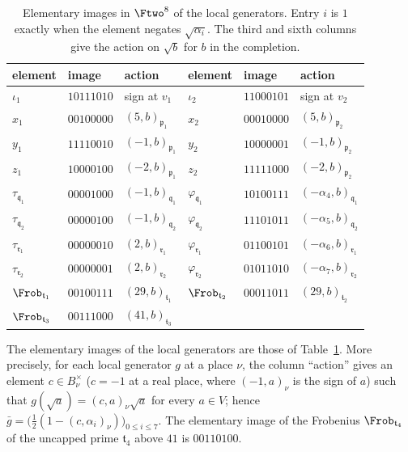 \begin{table}[htbp]
\centering
\caption{Elementary images in $\Ftwo^8$ of the local generators. Entry $i$
is $1$ exactly when the element negates $\sqrt{\alpha_i}$. The third and
sixth columns give the action on $\sqrt b$ for $b$ in the completion.}
\label{tw:vector-table}
\begin{tabular}{lll@{\qquad}lll}
\toprule
element & image & action & element & image & action\\
\midrule
$\iota_1$ & $10111010$ & sign at $v_1$ & $\iota_2$ & $11000101$ & sign at $v_2$\\
$x_1$ & $00100000$ & $(5,b)_{\mathfrak p_1}$ & $x_2$ & $00010000$ & $(5,b)_{\mathfrak p_2}$\\
$y_1$ & $11110010$ & $(-1,b)_{\mathfrak p_1}$ & $y_2$ & $10000001$ & $(-1,b)_{\mathfrak p_2}$\\
$z_1$ & $10000100$ & $(-2,b)_{\mathfrak p_1}$ & $z_2$ & $11111000$ & $(-2,b)_{\mathfrak p_2}$\\
$\tau_{\mathfrak q_1}$ & $00001000$ & $(-1,b)_{\mathfrak q_1}$ & $\varphi_{\mathfrak q_1}$ & $10100111$ & $(-\alpha_4,b)_{\mathfrak q_1}$\\
$\tau_{\mathfrak q_2}$ & $00000100$ & $(-1,b)_{\mathfrak q_2}$ & $\varphi_{\mathfrak q_2}$ & $11101011$ & $(-\alpha_5,b)_{\mathfrak q_2}$\\
$\tau_{\mathfrak r_1}$ & $00000010$ & $(2,b)_{\mathfrak r_1}$ & $\varphi_{\mathfrak r_1}$ & $01100101$ & $(-\alpha_6,b)_{\mathfrak r_1}$\\
$\tau_{\mathfrak r_2}$ & $00000001$ & $(2,b)_{\mathfrak r_2}$ & $\varphi_{\mathfrak r_2}$ & $01011010$ & $(-\alpha_7,b)_{\mathfrak r_2}$\\
$\Frob_{\mathfrak t_1}$ & $00100111$ & $(29,b)_{\mathfrak t_1}$ & $\Frob_{\mathfrak t_2}$ & $00011011$ & $(29,b)_{\mathfrak t_2}$\\
$\Frob_{\mathfrak t_3}$ & $00111000$ & $(41,b)_{\mathfrak t_3}$ & & &\\
\bottomrule
\end{tabular}
\end{table}

\begin{lemma}\label{tw:vectors}
The elementary images of the local generators are those of
Table~\ref{tw:vector-table}. More precisely, for each local generator $g$ at
a place $\nu$, the column ``action'' gives an element $c\in B_\nu^\times$
($c=-1$ at a real place, where $(-1,a)_\nu$ is the sign of $a$) such that
$g(\sqrt a)=(c,a)_\nu\sqrt a$ for every $a\in V$; hence
$\bar g=\bigl(\tfrac12(1-(c,\alpha_i)_\nu)\bigr)_{0\le i\le7}$. The
elementary image of the Frobenius $\Frob_{\mathfrak t_4}$ of the uncapped
prime $\mathfrak t_4$ above $41$ is $00110100$.
\end{lemma}

